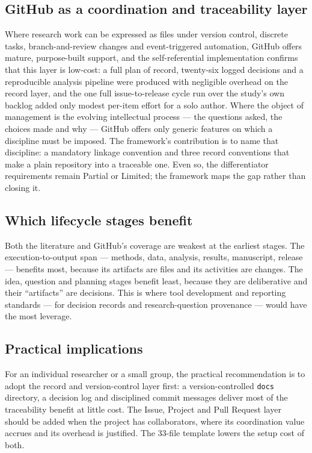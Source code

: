 \documentclass[pdflatex,sn-mathphys-num]{sn-jnl}%
\begin{document}
\subsection{GitHub as a coordination and traceability layer}\label{sec:d-layer}

Where research work can be expressed as files under version control, discrete tasks, branch-and-review changes and event-triggered automation, GitHub offers mature, purpose-built support, and the self-referential implementation confirms that this layer is low-cost: a full plan of record, twenty-six logged decisions and a reproducible analysis pipeline were produced with negligible overhead on the record layer, and the one full issue-to-release cycle run over the study's own backlog added only modest per-item effort for a solo author. Where the object of management is the evolving intellectual process --- the questions asked, the choices made and why --- GitHub offers only generic features on which a discipline must be imposed. The framework's contribution is to name that discipline: a mandatory linkage convention and three record conventions that make a plain repository into a traceable one. Even so, the differentiator requirements remain Partial or Limited; the framework maps the gap rather than closing it.

\subsection{Which lifecycle stages benefit}\label{sec:d-lifecycle}

Both the literature and GitHub's coverage are weakest at the earliest stages. The execution-to-output span --- methods, data, analysis, results, manuscript, release --- benefits most, because its artifacts are files and its activities are changes. The idea, question and planning stages benefit least, because they are deliberative and their ``artifacts'' are decisions. This is where tool development and reporting standards --- for decision records and research-question provenance --- would have the most leverage.

\subsection{Practical implications}\label{sec:d-practical}

For an individual researcher or a small group, the practical recommendation is to adopt the record and version-control layer first: a version-controlled \texttt{docs} directory, a decision log and disciplined commit messages deliver most of the traceability benefit at little cost. The Issue, Project and Pull Request layer should be added when the project has collaborators, where its coordination value accrues and its overhead is justified. The 33-file template lowers the setup cost of both.
\end{document}
